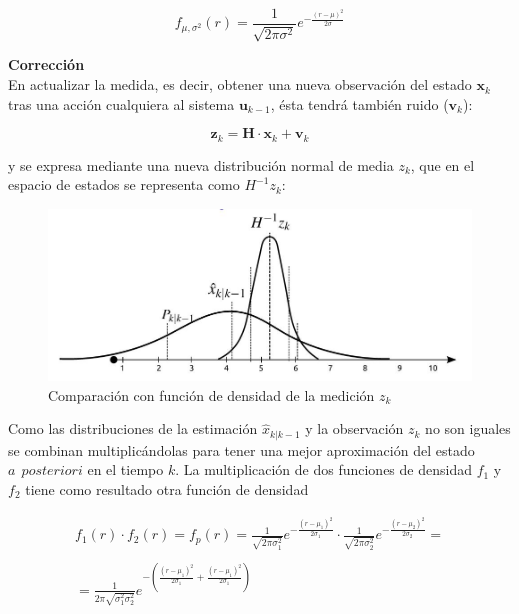 \documentclass[twoside,11pt]{report}
\begin{document}
\begin{equation}
f_{\mu,\sigma^{2}}(r)=\frac{1}{\sqrt{2\pi \sigma^{2}}}e^{-\frac{(r-\mu)^{2}}{2\sigma}}
\end{equation}		

\textbf{Corrección}\\

En actualizar la medida, es decir, obtener una nueva observación del estado $\mathbf{x}_{k}$ tras una acción cualquiera al sistema  $\mathbf{u}_{k-1}$, ésta tendrá también ruido ($\mathbf{v}_{k}$):

\begin{equation}
\mathbf{z}_{k}=\mathbf{H} \cdot \mathbf{x}_{k} + \mathbf{v}_{k}
\end{equation}

y se expresa mediante una nueva distribución normal de media $z_{k}$, que en el espacio de estados se representa como $H^{-1}z_{k}$:

\begin{figure}[h!]
\begin{center}
\includegraphics[scale=0.35]{images/comp_fun_dens_x.jpeg}
\caption{Comparación con función de densidad de la medición $z_{k}$}
\end{center}
\end{figure}

Como las distribuciones de la estimación $\hat{x}_{k|k-1}$ y la observación $z_{k}$ no son iguales se combinan multiplicándolas para tener una mejor aproximación del estado $a \>\> posteriori$ en el tiempo $k$. La multiplicación de dos funciones de densidad $f_{1}$ y $f_{2}$ tiene como resultado otra función de densidad 

\begin{equation}
\begin{array}{c}
f_{1}(r) \cdot f_{2}(r) = f_{p}(r)= \frac{1}{\sqrt{2\pi \sigma^{2}_{1}}}e^{-\frac{(r-\mu_{1})^{2}}{2\sigma_{1}}} \cdot \frac{1}{\sqrt{2\pi \sigma^{2}_{2}}}e^{-\frac{(r-\mu_{2})^{2}}{2\sigma_{2}}} = \\   \\
=\frac{1}{2\pi \sqrt{\sigma^{2}_{1}\sigma^{2}_{2}}}e^{-\left(\frac{(r-\mu_{1})^{2}}{2\sigma_{1}}+\frac{(r-\mu_{1})^{2}}{2\sigma_{1}}\right)} \end{array}
\end{equation}
\end{document}
